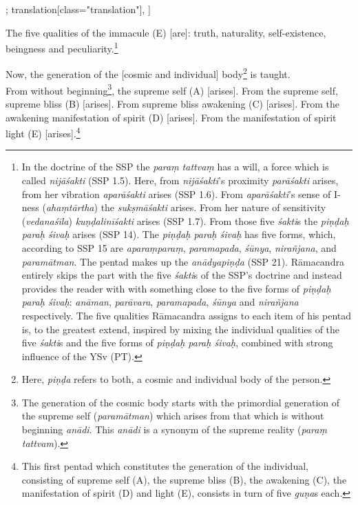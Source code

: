 \begin{alignment}[
  texts=edition[class="edition"];
  translation[class="translation"],
  ]
\begin{translation}
\begin{tlate}[p48_03]
     The five qualities of the immacule (E) [are]: truth, naturality, self-existence, beingness and peculiarity.\footnote{In the doctrine of the SSP the \textit{paraṃ tattvaṃ} has a will, a force which is called \textit{nijāśakti} (SSP 1.5). Here, from \textit{nijāśakti}'s proximity \textit{parāśakti} arises, from her vibration \textit{aparāśakti} arises (SSP 1.6). From \textit{aparāśakti}'s sense of I-ness (\textit{ahaṃtārtha}) the \textit{sukṣmāśakti} arises. From her nature of sensitivity (\textit{vedanaśīla}) \textit{kuṇḍalinīśakti} arises (SSP 1.7). From those five \textit{śakti}s the \textit{piṇḍaḥ paraḥ śivaḥ} arises (SSP 14). The \textit{piṇḍaḥ paraḥ śivaḥ} has five forms, which, according to SSP 15 are \textit{aparaṃparaṃ}, \textit{paramapada}, \textit{śūnya}, \textit{nirañjana}, and \textit{paramātman}. The pentad makes up the \textit{anādyapiṇḍa} (SSP 21). Rāmacandra entirely skips the part with the five \textit{śakti}s of the SSP's doctrine and instead provides the reader with with something close to the five forms of \textit{piṇḍaḥ paraḥ śivaḥ}: \textit{anāman}, \textit{parāvara}, \textit{paramapada}, \textit{śūnya} and \textit{nirañjana} respectively. The five qualities Rāmacandra assigns to each item of his pentad is, to the greatest extend, inspired by mixing the individual qualities of the five \textit{śakti}s and the five forms of \textit{piṇḍaḥ paraḥ śivaḥ}, combined with strong influence of the YSv (PT).}
    \end{tlate}
    \begin{tlate}[p49_01]
Now, the generation of the [cosmic and individual] body\footnote{Here, \textit{piṇḍa} refers to both, a cosmic and individual body of the person.} is taught.\\

From without beginning\footnote{The generation of the cosmic body starts with the primordial generation of the supreme self (\textit{paramātman}) which arises from that which is without beginning \textit{anādi}. This \textit{anādi} is a synonym of the supreme reality (\textit{paraṃ tattvam}).}, the supreme self (A) [arises]. From the supreme self, supreme bliss (B) [arises]. From supreme bliss awakening (C) [arises]. From the awakening manifestation of spirit (D) [arises]. From the manifestation of spirit light (E) [arises].\footnote{This first pentad which constitutes the generation of the individual, consisting of supreme self (A), the supreme bliss (B), the awakening (C), the manifestation of spirit (D) and light (E), consists in turn of five \textit{guṇa}s each.} \\


\end{tlate}
\end{translation}
\end{alignment}
